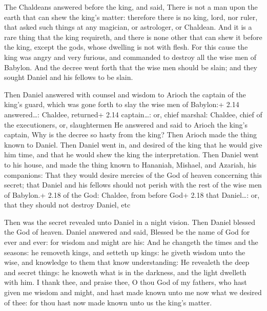  The Chaldeans answered before the king, and said, There
is not a man upon the earth that can shew the king's matter: therefore
there is no king, lord, nor ruler, that asked such things at any
magician, or astrologer, or Chaldean.  And it is a rare
thing that the king requireth, and there is none other that can shew it
before the king, except the gods, whose dwelling is not with flesh.
 For this cause the king was angry and very furious, and
commanded to destroy all the wise men of Babylon.  And the
decree went forth that the wise men should be slain; and they sought
Daniel and his fellows to be slain.

 Then Daniel answered with counsel and wisdom to Arioch
the captain of the king's guard, which was gone forth to slay the wise
men of Babylon:+ 2.14 answered\ldots: Chaldee, returned+ 2.14
captain\ldots: or, chief marshal: Chaldee, chief of the executioners,
or, slaughtermen  He answered and said to Arioch the king's
captain, Why is the decree so hasty from the king? Then Arioch made the
thing known to Daniel.  Then Daniel went in, and desired of
the king that he would give him time, and that he would shew the king
the interpretation.  Then Daniel went to his house, and
made the thing known to Hananiah, Mishael, and Azariah, his companions:
 That they would desire mercies of the God of heaven
concerning this secret; that Daniel and his fellows should not perish
with the rest of the wise men of Babylon.+ 2.18 of the God: Chaldee,
from before God+ 2.18 that Daniel\ldots: or, that they should not
destroy Daniel, etc

 Then was the secret revealed unto Daniel in a night
vision. Then Daniel blessed the God of heaven.  Daniel
answered and said, Blessed be the name of God for ever and ever: for
wisdom and might are his:  And he changeth the times and
the seasons: he removeth kings, and setteth up kings: he giveth wisdom
unto the wise, and knowledge to them that know understanding:
 He revealeth the deep and secret things: he knoweth what
is in the darkness, and the light dwelleth with him.  I
thank thee, and praise thee, O thou God of my fathers, who hast given me
wisdom and might, and hast made known unto me now what we desired of
thee: for thou hast now made known unto us the king's matter.

